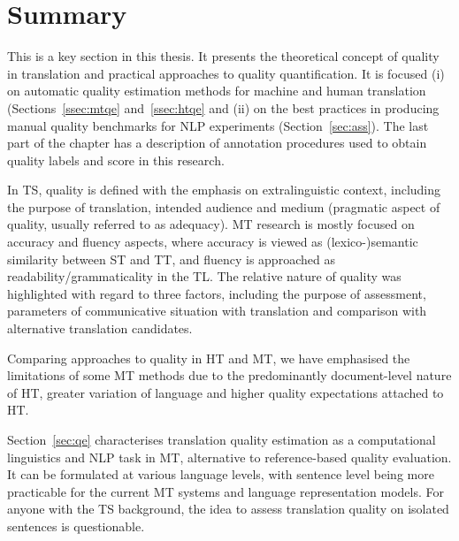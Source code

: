 \section{\label{sec:sum4}Summary}

This is a key section in this thesis. It presents the theoretical concept of quality in translation and practical approaches to quality quantification. 
It is focused (i) on automatic quality estimation methods for machine and human translation (Sections~\ref{ssec:mtqe} and~\ref{ssec:htqe} and (ii) on the best practices in producing manual quality benchmarks for NLP experiments (Section~\ref{sec:ass}). The last part of the chapter has a description of annotation procedures used to obtain quality labels and score in this research.

In \gls{TS}, quality is defined with the emphasis on extralinguistic context, including the purpose of translation, intended audience and medium (pragmatic aspect of quality, usually referred to as adequacy). MT research is mostly focused on accuracy and fluency aspects, where accuracy is viewed as (lexico-)semantic similarity between ST and TT, and fluency is approached as readability/grammaticality in the TL. The relative nature of quality was highlighted with regard to three factors, including the purpose of assessment, parameters of communicative situation with translation and comparison with alternative translation candidates. 

Comparing approaches to quality in HT and MT, we have emphasised the limitations of some MT methods due to the predominantly document-level nature of HT, greater variation of language and higher quality expectations attached to HT.

Section~\ref{sec:qe} characterises translation quality estimation as a computational linguistics and NLP task in MT, alternative to reference-based quality evaluation. It can be formulated at various language levels, with sentence level being more practicable for the current MT systems and language representation models. For anyone with the TS background, the idea to assess translation quality on isolated sentences is questionable. 

